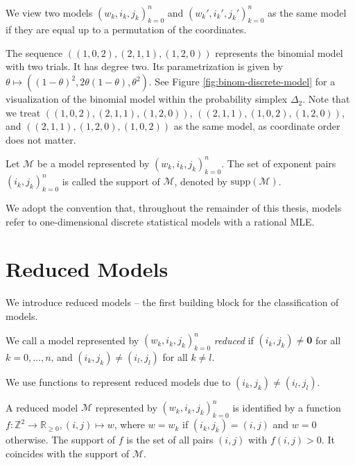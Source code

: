 \begin{remark}\label{rem:equivalent-models}
    We view two models \( (w_k,i_k,j_k)_{k=0}^n \) and \( (w_k',i_k',j_k')_{k=0}^n \) as the same model if they are equal up to a permutation of the coordinates.
\end{remark}

\begin{example}
    The sequence \( ((1,0,2), (2,1,1), (1,2,0)) \) represents the binomial model with two trials. It has degree two. Its parametrization is given by \( \theta \mapsto ((1-\theta)^2, 2\theta(1-\theta),\theta^2) \). See Figure \ref{fig:binom-discrete-model} for a visualization of the binomial model within the probability simplex \( \Delta_2 \). Note that we treat \( ((1,0,2), (2,1,1), (1,2,0)) \), \( ((2,1,1), (1,0,2), (1,2,0)) \), and \( ((2,1,1), (1,2,0), (1,0,2)) \) as the same model, as coordinate order does not matter.
\end{example}

\begin{definition}
    Let \( \mathcal{M} \) be a model represented by \( (w_k, i_k, j_k)_{k=0}^n \). The set of exponent pairs \( (i_k, j_k)_{k=0}^n \) is called the support of \( \mathcal{M} \), denoted by \( \mathrm{supp}(\mathcal{M}) \).
\end{definition}

We adopt the convention that, throughout the remainder of this thesis, models refer to one-dimensional discrete statistical models with a rational MLE.


\section{Reduced Models}

We introduce reduced models -- the first building block for the classification of models.


\begin{definition}
    We call a model represented by \( (w_k, i_k, j_k)_{k=0}^n \) \emph{reduced} if \( (i_k, j_k) \neq \mathbf 0 \) for all \( k = 0, \dots, n \), and \( (i_k, j_k) \neq (i_l, j_l) \) for all \( k \neq l \).
\end{definition}

We use functions to represent reduced models due to \( (i_k, j_k) \neq (i_l, j_l) \).

\begin{remark}\label{rem:representation-of-models-by-functions}
    A reduced model \( \mathcal{M} \) represented by \( (w_k, i_k, j_k)_{k=0}^n \) is identified by a function \( f: \mathbb{Z}^2 \to \mathbb{R}_{\geq 0}, (i, j) \mapsto w \), where \( w = w_k \) if \( (i_k, j_k) = (i, j) \) and \( w = 0 \) otherwise. The support of \( f \) is the set of all pairs \( (i, j) \) with \( f(i, j) > 0 \). It coincides with the support of \( \mathcal{M} \).
\end{remark}


